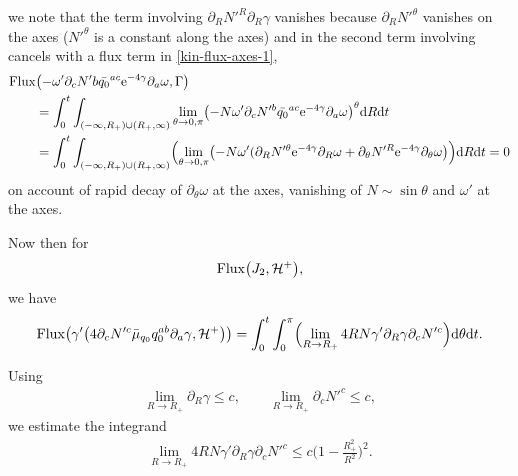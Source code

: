 \documentclass[pdftex]{sigma}
\def\ptl{\partial}%
\numberwithin{equation}{section}
\begin{document}
we note that the term involving $ \ptl_R N'^R \ptl_R \gamma $ vanishes because $\ptl_R N'^\theta$ vanishes on the axes \big($N'^\theta $ is a constant along the axes\big)
and in the second term involving \smash{$\ptl_\theta N'^\theta \ptl_\theta \gamma$} cancels with a flux term in \eqref{kin-flux-axes-1},
\begin{align*}
& {\rm Flux} \bigl(-\omega' \ptl_c N'b \bar{q_0}^{ac} {\rm e}^{-4\gamma} \ptl_a \omega, \Gamma\bigr) \notag\\
&\qquad{}= \int^t_0 \int_{ (-\infty, R_+) \cup (R_+, \infty) } \lim_{\theta \to 0, \pi} \bigl(
-N \omega' \ptl_c N'^b \bar{q_0}^{ac} {\rm e}^{-4\gamma} \ptl_a \omega \bigr)^\theta {\rm d}R {\rm d}t \notag\\
&\qquad{}= \int^t_0 \int_{ (-\infty, R_+) \cup (R_+, \infty) } \Bigl(\lim_{\theta \to 0, \pi} \bigl(- N \omega' (\ptl_R N'^ \theta {\rm e}^{-4\gamma} \ptl_R \omega + \ptl_\theta N'^ R {\rm e}^{-4 \gamma} \ptl_\theta \omega\bigr) \Bigr) {\rm d}R {\rm d}t
=0
\end{align*}
on account of rapid decay of $\ptl_\theta \omega$ at the axes, vanishing of $N \sim \sin \theta $ and $\omega'$ at the axes.

Now then for
\begin{align*}
{\rm Flux} \bigl(J_2, \mathcal{H}^+\bigr),
\end{align*}
we have
\begin{align*}
{\rm Flux} \bigl(\gamma' \bigl(4 \ptl_c N'^c \bar{\mu}_{q_0} q^{ab} _0 \ptl_a \gamma, \mathcal{H}^+\bigr)\bigr)
= \int^t_0 \int^\pi_0 \Bigl(\lim_{R \to R_+} 4 R N \gamma' \ptl_R \gamma \ptl_c N'^c\Bigr) {\rm d} \theta {\rm d}t.
\end{align*}

Using
\begin{align*}
\lim_{R \to R_+} \ptl_R \gamma \leq c, \qquad \lim_{R \to R_+} \ptl_c N'^c \leq c,
\end{align*}
 we estimate the integrand
\begin{align*}
\lim_{R \to R_+} 4 R N \gamma' \ptl_R \gamma \ptl_c N'^c \leq c \biggl(1- \frac{R^2_+}{R^2}\biggr)^2.
\end{align*}
\end{document}
